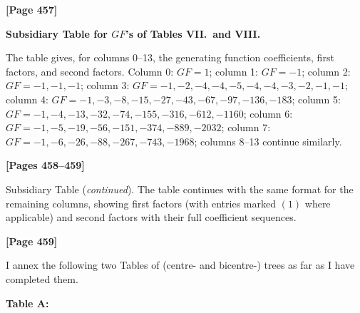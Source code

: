 \documentclass[11pt,a4paper]{book}
\begin{document}
\newpage
\textbf{[Page 457]}

\begin{center}
\textbf{Subsidiary Table for $GF$'s of Tables VII.\ and VIII.}
\end{center}

\begin{small}
The table gives, for columns 0--13, the generating function coefficients, first factors, and second factors. Column 0: $GF = 1$; column 1: $GF = -1$; column 2: $GF = -1,-1,-1$; column 3: $GF = -1,-2,-4,-4,-5,-4,-4,-3,-2,-1,-1$; column 4: $GF = -1,-3,-8,-15,-27,-43,-67,-97,-136,-183$; column 5: $GF = -1,-4,-13,-32,-74,-155,-316,-612,-1160$; column 6: $GF = -1,-5,-19,-56,-151,-374,-889,-2032$; column 7: $GF = -1,-6,-26,-88,-267,-743,-1968$; columns 8--13 continue similarly.
\end{small}

\textbf{[Pages 458--459]}

Subsidiary Table (\textit{continued}). The table continues with the same format for the remaining columns, showing first factors (with entries marked $(1)$ where applicable) and second factors with their full coefficient sequences.

\textbf{[Page 459]}

I annex the following two Tables of (centre- and bicentre-) trees as far as I have completed them.

\begin{center}
\textbf{Table A:}
\end{center}
\end{document}
